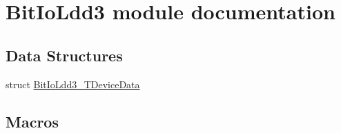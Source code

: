 \hypertarget{group___bit_io_ldd3__module}{}\section{Bit\+Io\+Ldd3 module documentation}
\label{group___bit_io_ldd3__module}
\subsection*{Data Structures}
\begin{DoxyCompactItemize}
\item 
struct \hyperlink{struct_bit_io_ldd3___t_device_data}{Bit\+Io\+Ldd3\+\_\+\+T\+Device\+Data}
\end{DoxyCompactItemize}
\subsection*{Macros}
